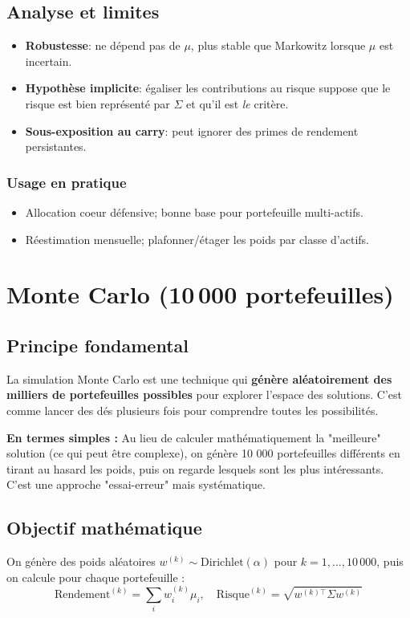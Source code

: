 \documentclass[11pt,a4paper]{article}
\begin{document}
\subsection{Analyse et limites}
\begin{itemize}
  \item \textbf{Robustesse}: ne dépend pas de \(\mu\), plus stable que Markowitz lorsque \(\mu\) est incertain.
  \item \textbf{Hypothèse implicite}: égaliser les contributions au risque suppose que le risque est bien représenté par \(\Sigma\) et qu'il est \emph{le} critère.
  \item \textbf{Sous-exposition au carry}: peut ignorer des primes de rendement persistantes.
\end{itemize}

\subsubsection*{Usage en pratique}
\begin{itemize}
  \item Allocation coeur défensive; bonne base pour portefeuille multi-actifs.
  \item Réestimation mensuelle; plafonner/étager les poids par classe d'actifs.
\end{itemize}

\FloatBarrier
\section{Monte Carlo (10\,000 portefeuilles)}

\subsection{Principe fondamental}
La simulation Monte Carlo est une technique qui \textbf{génère aléatoirement des milliers de portefeuilles possibles} pour explorer l'espace des solutions. C'est comme lancer des dés plusieurs fois pour comprendre toutes les possibilités.

\textbf{En termes simples :} Au lieu de calculer mathématiquement la "meilleure" solution (ce qui peut être complexe), on génère 10 000 portefeuilles différents en tirant au hasard les poids, puis on regarde lesquels sont les plus intéressants. C'est une approche "essai-erreur" mais systématique.

\subsection{Objectif mathématique}
On génère des poids aléatoires \(w^{(k)} \sim \text{Dirichlet}(\alpha)\) pour \(k = 1, \ldots, 10\,000\), puis on calcule pour chaque portefeuille :
\[\text{Rendement}^{(k)} = \sum_i w_i^{(k)} \mu_i, \quad \text{Risque}^{(k)} = \sqrt{w^{(k)\top} \Sigma w^{(k)}}\]
\end{document}
